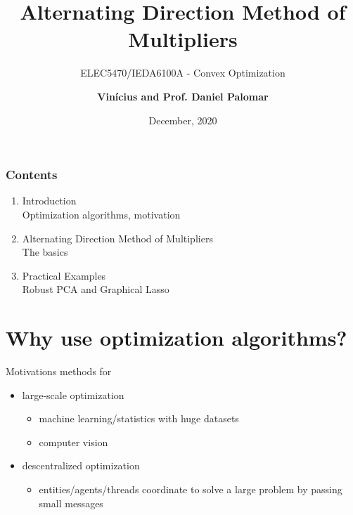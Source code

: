 \documentclass[aspectratio=169]{beamer}
\title{Alternating Direction Method of Multipliers}
\subtitle{\large{ELEC5470/IEDA6100A - Convex Optimization}}
\author{\normalsize{\textbf{Vin\'icius and Prof. Daniel Palomar}}}
\date{December, 2020}
\begin{document}
  \setcounter{showProgressBar}{0}
  \setcounter{showSlideNumbers}{0}

  \frame{\titlepage}

  \begin{frame}
    \frametitle{Contents}
    \begin{enumerate}
    \item Introduction \\ \textcolor{ExecusharesGrey}{\footnotesize\hspace{1em} Optimization algorithms, motivation}
    \item Alternating Direction Method of Multipliers \\ \textcolor{ExecusharesGrey}{\footnotesize\hspace{1em} The basics}
    \item Practical Examples \\ \textcolor{ExecusharesGrey}{\footnotesize\hspace{1em} Robust PCA and Graphical Lasso}
    \end{enumerate}
  \end{frame}

  \setcounter{framenumber}{0}
  \setcounter{showProgressBar}{1}
  \setcounter{showSlideNumbers}{1}

  \section*{Why use optimization algorithms?}
        \begin{frame}{Motivations}
          {\large methods for}
          \begin{itemize}
            \item large-scale optimization
              \begin{itemize}
                \item machine learning/statistics with huge datasets
                \item computer vision
              \end{itemize}
            \item descentralized optimization
              \begin{itemize}
                \item entities/agents/threads coordinate to solve a large problem by passing small messages
              \end{itemize}
          \end{itemize}
        \end{frame}
\end{document}
